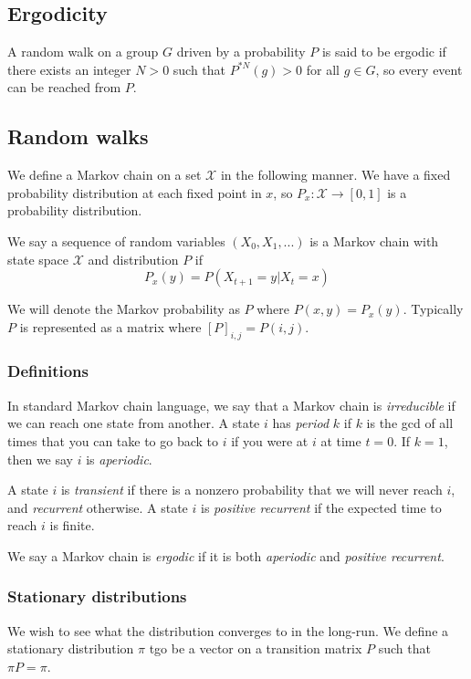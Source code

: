 \documentclass[]{article}
\theoremstyle{definition}
\numberwithin{theorem}{section}
\numberwithin{equation}{section}
\begin{document}
\subsection{Ergodicity}
A random walk on a group $G$ driven by a probability $P$ is said to be ergodic if there exists an integer $N > 0$ such that $P^{\ast N}(g) > 0$ for all $g \in G$, so every event can be reached from $P$. 

\subsection{Random walks}
We define a Markov chain on a set $\mathcal{X}$ in the following manner. We have a fixed probability distribution at each fixed point in $x$, so $P_x : \mathcal{X} \rightarrow [0, 1]$ is a probability distribution. 

We say a sequence of random variables $(X_0, X_1, ...)$ is a Markov chain with state space $\mathcal{X}$ and distribution $P$ if 
\begin{equation}
	P_x(y) = P(X_{t + 1} = y | X_t = x)
\end{equation}

We will denote the Markov probability as $P$ where $P(x, y) = P_x(y)$. Typically $P$ is represented as a matrix where $[P]_{i,j} = P(i, j)$. 

\subsubsection{Definitions}
In standard Markov chain language, we say that a Markov chain is \textit{irreducible} if we can reach one state from another. A state $i$ has \textit{period} $k$ if $k$ is the gcd of all times that you can take to go back to $i$ if you were at $i$ at time $t = 0$. If $k = 1$, then we say $i$ is \textit{aperiodic}. 

A state $i$ is \textit{transient} if there is a nonzero probability that we will never reach $i$, and \textit{recurrent} otherwise. A state $i$ is \textit{positive recurrent} if the expected time to reach $i$ is finite.

We say a Markov chain is \textit{ergodic} if it is both \textit{aperiodic} and \textit{positive recurrent}. 
\subsubsection{Stationary distributions}
We wish to see what the distribution converges to in the long-run. We define a stationary distribution $\pi$ tgo be a vector on a transition matrix $P$ such that $\pi P = \pi$. 
\end{document}
